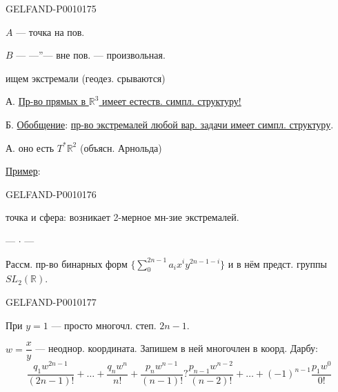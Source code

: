 \begin{GelfandAdjacentEvidence}{GELFAND-P001017}{5}


$A$ --- точка на пов.

$B$ --- ---''--- вне пов. --- произвольная.

ищем экстремали (геодез. срываются)

А. \underline{Пр-во прямых в $\mathbb{R}^3$ имеет естеств. симпл. структуру!}

Б. \underline{Обобщение}: \underline{пр-во экстремалей любой вар. задачи имеет симпл. структуру}.

А. оно есть $T^*\mathbb{R}^2$ (объясн. Арнольда)

\underline{Пример}:

\end{GelfandAdjacentEvidence}
\begin{GelfandAdjacentEvidence}{GELFAND-P001017}{6}


точка и сфера: возникает 2-мерное мн-зие экстремалей.

\begin{center}--- $\cdot$ ---\end{center}
Рассм. пр-во бинарных форм $\bigl\{\sum_0^{2n-1}a_i x^i y^{2n-1-i}\bigr\}$
и в нём предст. группы $SL_2(\mathbb{R})$.
\end{GelfandAdjacentEvidence}
\begin{GelfandAdjacentEvidence}{GELFAND-P001017}{7}

При $y=1$ --- просто многочл. степ. $2n-1$.

$w=\dfrac{x}{y}$ --- неоднор. координата.
Запишем в ней многочлен в коорд. Дарбу:
\[
\frac{q_1w^{2n-1}}{(2n-1)!}+\ldots+\frac{q_nw^n}{n!}
+\frac{p_nw^{n-1}}{(n-1)!}\mathrel{\boxed{?}}
\frac{p_{n-1}w^{n-2}}{(n-2)!}+\ldots+(-1)^{n-1}\frac{p_1w^0}{0!}
\]
\end{GelfandAdjacentEvidence}



